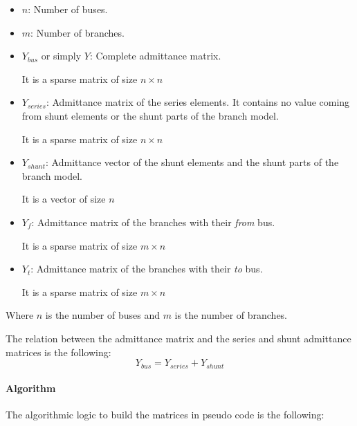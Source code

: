 \documentclass[nols,a4paper,twoside,notoc,fleqn]{tufte-book}
\begin{document}
\begin{itemize}
	
	\item $n$: Number of buses.
	
	\item $m$: Number of branches.
	
	\item $Y_{bus}$ or simply $Y$: Complete admittance matrix.
	
	It is a sparse matrix of size $n \times n$
	
	\item $Y_{series}$: Admittance matrix of the series elements. It contains no value coming from shunt elements or the shunt parts of the branch model.
	
	It is a sparse matrix of size $n \times n$
	
	\item $Y_{shunt}$: Admittance vector of the shunt elements and the shunt parts of the branch model. 
	
	It is a vector of size $n$
	
	\item $Y_f$: Admittance matrix of the branches with their \textit{from} bus.
	
	It is a sparse matrix of size $m \times n$
	
	\item $Y_t$: Admittance matrix of the branches with their \textit{to} bus.
	
	It is a sparse matrix of size $m \times n$\newline
\end{itemize}

Where $n$ is the number of buses and $m$ is the number of branches.

The relation between the admittance matrix and the series and shunt admittance matrices is the following:
\begin{equation}
Y_{bus} = Y_{series} + Y_{shunt}
\end{equation}

\paragraph{Algorithm} The algorithmic logic to build the matrices in pseudo code is the following:
\end{document}
